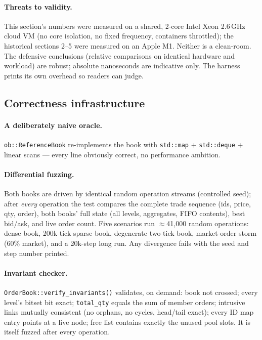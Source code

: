 \documentclass[11pt,a4paper]{article}
\begin{document}
\paragraph{Threats to validity.} This section's numbers were measured on a
shared, 2-core Intel Xeon 2.6\,GHz cloud VM (no core isolation, no fixed
frequency, containers throttled); the historical sections 2--5 were measured
on an Apple M1. Neither is a clean-room. The defensive conclusions
(relative comparisons on identical hardware and workload) are robust;
absolute nanoseconds are indicative only. The harness prints its own
overhead so readers can judge.

\subsection{Correctness infrastructure}

\paragraph{A deliberately naive oracle.}
\texttt{ob::ReferenceBook} re-implements the book with
\texttt{std::map} + \texttt{std::deque} + linear scans --- every line
obviously correct, no performance ambition.

\paragraph{Differential fuzzing.} Both books are driven by identical random
operation streams (controlled seed); after \emph{every} operation the test
compares the complete trade sequence (ids, price, qty, order), both books'
full state (all levels, aggregates, FIFO contents), best bid/ask, and live
order count. Five scenarios run $\approx$41{,}000 random operations:
dense book, 200k-tick sparse book, degenerate two-tick book, market-order
storm (60\% market), and a 20k-step long run. Any divergence fails with the
seed and step number printed.

\paragraph{Invariant checker.} \texttt{OrderBook::verify\_invariants()}
validates, on demand: book not crossed; every level's bitset bit exact;
\texttt{total\_qty} equals the sum of member orders; intrusive links
mutually consistent (no orphans, no cycles, head/tail exact); every ID map
entry points at a live node; free list contains exactly the unused pool
slots. It is itself fuzzed after every operation.
\end{document}
